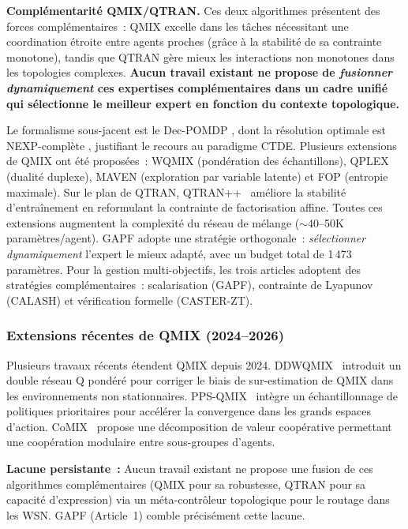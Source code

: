 \textbf{Complémentarité QMIX/QTRAN.} Ces deux algorithmes présentent des forces complémentaires~: QMIX excelle dans les tâches nécessitant une coordination étroite entre agents proches (grâce à la stabilité de sa contrainte monotone), tandis que QTRAN gère mieux les interactions non monotones dans les topologies complexes. \textbf{Aucun travail existant ne propose de \emph{fusionner dynamiquement} ces expertises complémentaires dans un cadre unifié qui sélectionne le meilleur expert en fonction du contexte topologique.}

Le formalisme sous-jacent est le Dec-POMDP \cite{OliehoekAmato2016}, dont la résolution optimale est NEXP-complète \cite{Bernstein2002DecPOMDP}, justifiant le recours au paradigme CTDE. Plusieurs extensions de QMIX ont été proposées~: WQMIX \cite{Rashid2020WQMIX} (pondération des échantillons), QPLEX \cite{Wang2021QPLEX} (dualité duplexe), MAVEN \cite{Mahajan2019MAVEN} (exploration par variable latente) et FOP \cite{Zhang2021FOP} (entropie maximale). Sur le plan de QTRAN, QTRAN++~\cite{qtranpp_arxiv2020} améliore la stabilité d'entraînement en reformulant la contrainte de factorisation affine. Toutes ces extensions augmentent la complexité du réseau de mélange ($\sim$40--50K paramètres/agent). GAPF adopte une stratégie orthogonale~: \emph{sélectionner dynamiquement} l'expert le mieux adapté, avec un budget total de 1\,473 paramètres. Pour la gestion multi-objectifs, les trois articles adoptent des stratégies complémentaires~: scalarisation (GAPF), contrainte de Lyapunov (CALASH) et vérification formelle (CASTER-ZT).

\subsubsection{Extensions récentes de QMIX (2024--2026)}

Plusieurs travaux récents étendent QMIX depuis 2024.
DDWQMIX~\cite{ddwqmix_cac2024} introduit un double réseau Q pondéré pour corriger le biais de sur-estimation de QMIX dans les environnements non stationnaires.
PPS-QMIX~\cite{pps_qmix_arxiv2024} intègre un échantillonnage de politiques prioritaires pour accélérer la convergence dans les grands espaces d'action.
CoMIX~\cite{comix_arxiv2024} propose une décomposition de valeur coopérative permettant une coopération modulaire entre sous-groupes d'agents.

\textbf{Lacune persistante~:} Aucun travail existant ne propose une fusion de ces algorithmes complémentaires (QMIX pour sa robustesse, QTRAN pour sa capacité d'expression) via un méta-contrôleur topologique pour le routage dans les WSN. GAPF (Article~1) comble précisément cette lacune.

